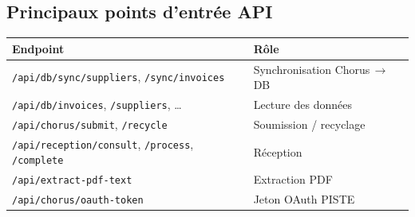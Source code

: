 \documentclass[11pt,a4paper]{article}
\newcommand{\code}[1]{\texttt{\small #1}}
\begin{document}
\subsection{Principaux points d'entrée API}
\begin{longtable}{p{6.5cm} p{8cm}}
\toprule
\textbf{Endpoint} & \textbf{Rôle} \\
\midrule
\endhead
\code{/api/db/sync/suppliers}, \code{/sync/invoices} & Synchronisation Chorus\,$\rightarrow$\,DB \\
\code{/api/db/invoices}, \code{/suppliers}, \dots & Lecture des données \\
\code{/api/chorus/submit}, \code{/recycle} & Soumission / recyclage \\
\code{/api/reception/consult}, \code{/process}, \code{/complete} & Réception \\
\code{/api/extract-pdf-text} & Extraction PDF \\
\code{/api/chorus/oauth-token} & Jeton OAuth PISTE \\
\bottomrule
\end{longtable}
\end{document}
